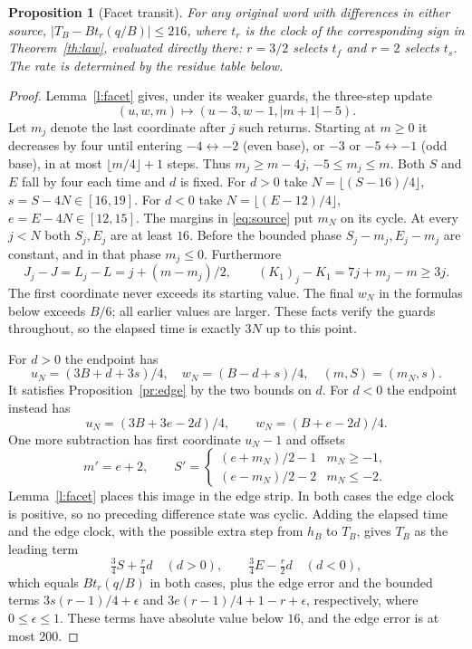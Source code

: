 \documentclass[11pt,reqno]{amsart}
\newtheorem{proposition}[theorem]{Proposition}
\begin{document}
\begin{proposition}[Facet transit]\label{pr:facet}
For any original word with differences in either source,
$|T_B-Bt_r(q/B)|\le216$, where $t_r$ is the clock of the corresponding
sign in Theorem~\ref{th:law}, evaluated directly there: $r=3/2$ selects
$t_f$ and $r=2$ selects $t_s$. The rate is determined by the residue
table below.
\end{proposition}
\begin{proof}
Lemma~\ref{l:facet} gives, under its weaker guards, the three-step
update
\[
 (u,w,m)\mapsto(u-3,w-1,|m+1|-5).
\]
Let $m_j$ denote the last coordinate after $j$ such returns. Starting at
$m\ge0$ it decreases by four until entering $-4\leftrightarrow-2$
(even base), or $-3$ or $-5\leftrightarrow-1$ (odd base), in at most
$\lfloor m/4\rfloor+1$ steps. Thus $m_j\ge m-4j$, $-5\le m_j\le m$.
Both $S$ and $E$ fall by four each time and $d$ is fixed. For $d>0$
take $N=\lfloor(S-16)/4\rfloor$, $s=S-4N\in[16,19]$. For $d<0$ take
$N=\lfloor(E-12)/4\rfloor$, $e=E-4N\in[12,15]$. The margins in
\eqref{eq:source} put $m_N$ on its cycle. At every $j<N$ both $S_j,E_j$
are at least $16$. Before the bounded phase $S_j-m_j,E_j-m_j$ are
constant, and in that phase $m_j\le0$. Furthermore
\[
 J_j-J=L_j-L=j+(m-m_j)/2,\qquad (K_1)_j-K_1=7j+m_j-m\ge3j .
\]
The first coordinate never exceeds its starting value. The final $w_N$
in the formulas below exceeds $B/6$; all earlier values are larger.
These facts verify the guards throughout, so the elapsed time is exactly
$3N$ up to this point.

For $d>0$ the endpoint has
\[
 u_N=(3B+d+3s)/4,\quad w_N=(B-d+s)/4,\quad (m,S)=(m_N,s).
\]
It satisfies Proposition~\ref{pr:edge} by the two bounds on $d$.
For $d<0$ the endpoint instead has
\[
 u_N=(3B+3e-2d)/4,\qquad w_N=(B+e-2d)/4 .
\]
One more subtraction has first coordinate $u_N-1$ and offsets
\begin{equation}\label{eq:neg}
 m'=e+2,\qquad S'=
 \begin{cases}(e+m_N)/2-1&m_N\ge-1,\\
               (e-m_N)/2-2&m_N\le-2.
 \end{cases}
\end{equation}
Lemma~\ref{l:facet} places this image in the edge strip. In both cases
the edge clock is positive, so no preceding difference state was cyclic.
Adding the elapsed time and the edge clock, with the possible extra step
from $h_B$ to $T_B$, gives $T_B$ as the leading term
\[
 \tfrac34S+\tfrac r4d\quad(d>0),\qquad
 \tfrac34E-\tfrac r2d\quad(d<0),
\]
which equals $Bt_r(q/B)$ in both cases, plus the edge error and the
bounded terms $3s(r-1)/4+\epsilon$ and $3e(r-1)/4+1-r+\epsilon$,
respectively, where $0\le\epsilon\le1$. These terms have absolute value
below $16$, and the edge error is at most $200$.


\end{proof}
\end{document}
